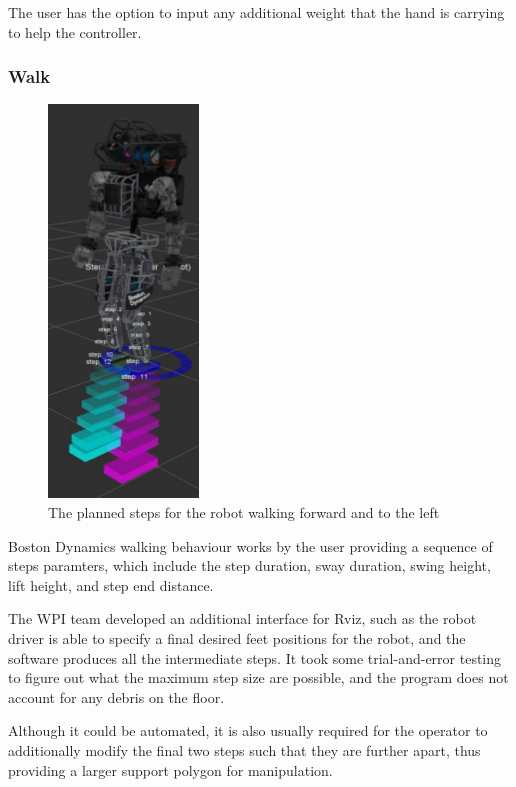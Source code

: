 \documentclass[12pt]{report}
\begin{document}
The user has the option to input any additional weight that the hand is carrying to help the controller.


\subsubsection{Walk}
 \begin{figure}
  \begin{center}
    \includegraphics[scale=0.4]{images/step_gui.png}
  \end{center}
  \caption{The planned steps for the robot walking forward and to the left}
\end{figure}



Boston Dynamics walking behaviour works by the user providing a sequence of steps paramters, which include the step duration, sway duration, swing height, lift height, and step end distance.  

The WPI team developed an additional interface for Rviz, such as the robot driver is able to specify a final desired feet positions for the robot, and the software produces all the intermediate steps. It took some trial-and-error testing to figure out what the maximum step size are possible, and the program does not account for any debris on the floor. 

Although it could be automated, it is also usually required for the operator to additionally modify the final two steps such that they are further apart, thus providing a larger support polygon for manipulation.
\end{document}
